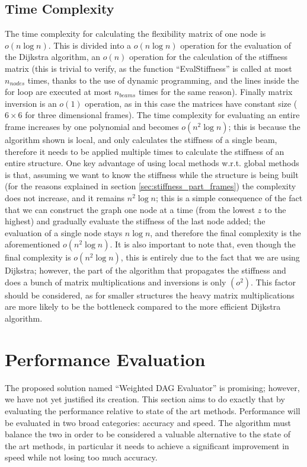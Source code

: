 \subsection{Time Complexity}

The time complexity for calculating the flexibility matrix of one node is $o(n \log{n})$.
This is divided into a $o(n \log{n})$ operation for the evaluation of the Dijkstra algorithm,
an $o(n)$ operation for the calculation of the stiffness matrix (this is trivial to verify, as 
the function ``EvalStiffness'' is called at most $n_{nodes}$ times, thanks to the use of dynamic programming,
and the lines inside the for loop are executed at most $n_{beams}$ times for the same reason).
Finally matrix inversion is an $o(1)$ operation, as in this case the matrices have constant size ($6 \times 6$ for 
three dimensional frames).
The time complexity for evaluating an entire frame increases by one polynomial and becomes $o(n^2 \log{n})$;
this is because the algorithm shown is local, and only calculates the stiffness of a single beam, therefore 
it needs to be applied multiple times to calculate the stiffness of an entire structure.
One key advantage of using local methods w.r.t. global methods is that, assuming we want to know the 
stiffness while the structure is being built (for the reasons explained in section \ref{sec:stiffness_part_frames})
the complexity does not increase, and it remains $n^2 \log{n}$; this is a simple consequence of the fact
that we can construct the graph one node at a time (from the lowest $z$ to the highest) and gradually
evaluate the stiffness of the last node added; the evaluation of a single node stays $n \log {n}$, and therefore
the final complexity is the aforementioned $o(n^2 \log{n})$. It is also important to note that, even though the 
final complexity is $o(n^2 \log{n})$, this is entirely due to the fact that we are using Dijkstra; however,
the part of the algorithm that propagates the stiffness and does a bunch of matrix multiplications and
inversions is only $(o^2)$. This factor should be considered, as for smaller structures the heavy matrix multiplications
are more likely to be the bottleneck compared to the more efficient Dijkstra algorithm.

\section{Performance Evaluation}

The proposed solution named ``Weighted DAG Evaluator'' is promising; however, we have not yet justified its
creation. This section aims to do exactly that by evaluating the performance relative to state of the art methods.
Performance will be evaluated in two broad categories: accuracy and speed. The algorithm must balance the two
in order to be considered a valuable alternative to the state of the art methods, in particular it needs to
achieve a significant improvement in speed while not losing too much accuracy.


